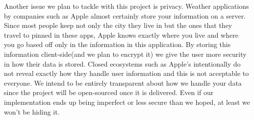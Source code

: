 \documentclass[10pt,conference,onecolumn,compsoc]{IEEEtran}
\begin{document}
\quad Another issue we plan to tackle with this project is privacy. Weather applications by companies such as Apple almost certainly store your information on a server. Since most people keep not only the city they live in but the ones that they travel to pinned in these apps, Apple knows exactly where you live and where you go based off only in the information in this application. By storing this information client-side(and we plan to encrypt it) we give the user more security in how their data is stored. Closed ecosystems such as Apple's intentionally do not reveal exactly how they handle user information and this is not acceptable to everyone. We intend to be entirely transparent about how we handle your data since the project will be open-sourced once it is delivered. Even if our implementation ends up being imperfect or less secure than we hoped, at least we won't be hiding it.










\end{document}
